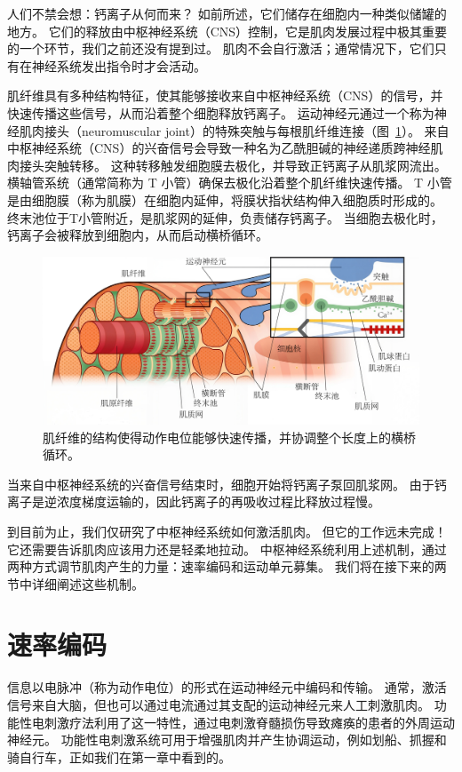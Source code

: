 人们不禁会想：钙离子从何而来？
如前所述，它们储存在细胞内一种类似储罐的地方。
它们的释放由中枢神经系统（CNS）控制，它是肌肉发展过程中极其重要的一个环节，我们之前还没有提到过。
肌肉不会自行激活；通常情况下，它们只有在神经系统发出指令时才会活动。


肌纤维具有多种结构特征，使其能够接收来自中枢神经系统（CNS）的信号，并快速传播这些信号，从而沿着整个细胞释放钙离子。
运动神经元通过一个称为神经肌肉接头（neuromuscular joint）的特殊突触与每根肌纤维连接（图~\ref{fig:4_11}）。
来自中枢神经系统（CNS）的兴奋信号会导致一种名为乙酰胆碱的神经递质跨神经肌肉接头突触转移。
这种转移触发细胞膜去极化，并导致正钙离子从肌浆网流出。
横轴管系统（通常简称为 T 小管）确保去极化沿着整个肌纤维快速传播。
T 小管是由细胞膜（称为肌膜）在细胞内延伸，将膜状指状结构伸入细胞质时形成的。
终末池位于T小管附近，是肌浆网的延伸，负责储存钙离子。
当细胞去极化时，钙离子会被释放到细胞内，从而启动横桥循环。


\begin{figure}[!htb]
	\centering
	\includegraphics[width=1.0\linewidth]{chap4/4_11}
	\caption{肌纤维的结构使得动作电位能够快速传播，并协调整个长度上的横桥循环。 \label{fig:4_11}}
\end{figure}

当来自中枢神经系统的兴奋信号结束时，细胞开始将钙离子泵回肌浆网。
由于钙离子是逆浓度梯度运输的，因此钙离子的再吸收过程比释放过程慢。


到目前为止，我们仅研究了中枢神经系统如何激活肌肉。
但它的工作远未完成！它还需要告诉肌肉应该用力还是轻柔地拉动。
中枢神经系统利用上述机制，通过两种方式调节肌肉产生的力量：速率编码和运动单元募集。
我们将在接下来的两节中详细阐述这些机制。


\section{速率编码}

信息以电脉冲（称为动作电位）的形式在运动神经元中编码和传输。
通常，激活信号来自大脑，但也可以通过电流通过其支配的运动神经元来人工刺激肌肉。
功能性电刺激疗法利用了这一特性，通过电刺激脊髓损伤导致瘫痪的患者的外周运动神经元。
功能性电刺激系统可用于增强肌肉并产生协调运动，例如划船、抓握和骑自行车，正如我们在第一章中看到的。


